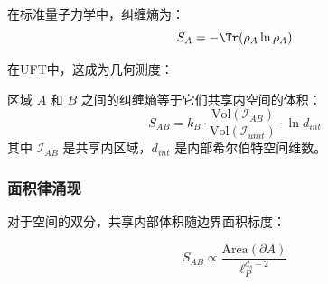 在标准量子力学中，纠缠熵为：
\begin{equation}
    S_A = -\Tr(\rho_A \ln \rho_A)
\end{equation}

在UFT中，这成为几何测度：

\begin{theorem}[纠缠熵几何公式]
区域 $A$ 和 $B$ 之间的纠缠熵等于它们共享内空间的体积：
\begin{equation}
    S_{AB} = k_B \cdot \frac{\text{Vol}(\mathcal{I}_{AB})}{\text{Vol}(\mathcal{I}_{unit})} \cdot \ln d_{int}
\end{equation}
其中 $\mathcal{I}_{AB}$ 是共享内区域，$d_{int}$ 是内部希尔伯特空间维数。
\end{theorem}

\subsubsection{面积律涌现}

对于空间的双分，共享内部体积随边界面积标度：

\begin{equation}
    S_{AB} \propto \frac{\text{Area}(\partial A)}{\ell_P^{d_s-2}}
\end{equation}
